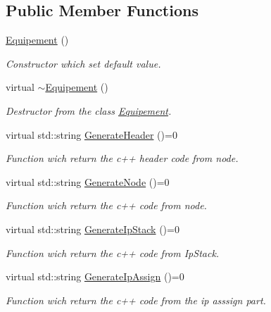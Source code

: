 \subsection*{Public Member Functions}
\begin{CompactItemize}
\item 
\hyperlink{class_equipement_9057a4777d006cbac4c72d09a8d09407}{Equipement} ()
\begin{CompactList}\small\item\em Constructor which set default value. \item\end{CompactList}\item 
virtual \hyperlink{class_equipement_e7751a52f2665d9e4b3e2cd6929bd986}{$\sim$Equipement} ()
\begin{CompactList}\small\item\em Destructor from the class \hyperlink{class_equipement}{Equipement}. \item\end{CompactList}\item 
virtual std::string \hyperlink{class_equipement_136cc8d242b48a665691f8edafa48210}{GenerateHeader} ()=0
\begin{CompactList}\small\item\em Function wich return the c++ header code from node. \item\end{CompactList}\item 
virtual std::string \hyperlink{class_equipement_e03cafed5e059dfe332643719c8d8dd4}{GenerateNode} ()=0
\begin{CompactList}\small\item\em Function wich return the c++ code from node. \item\end{CompactList}\item 
virtual std::string \hyperlink{class_equipement_98eda1e24e07c343712dcd35eba6bd18}{GenerateIpStack} ()=0
\begin{CompactList}\small\item\em Function wich return the c++ code from IpStack. \item\end{CompactList}\item 
virtual std::string \hyperlink{class_equipement_74f771f93374710e8aa42ae17e6b54b4}{GenerateIpAssign} ()=0
\begin{CompactList}\small\item\em Function wich return the c++ code from the ip asssign part. \item\end{CompactList}\item 

\end{CompactItemize}

